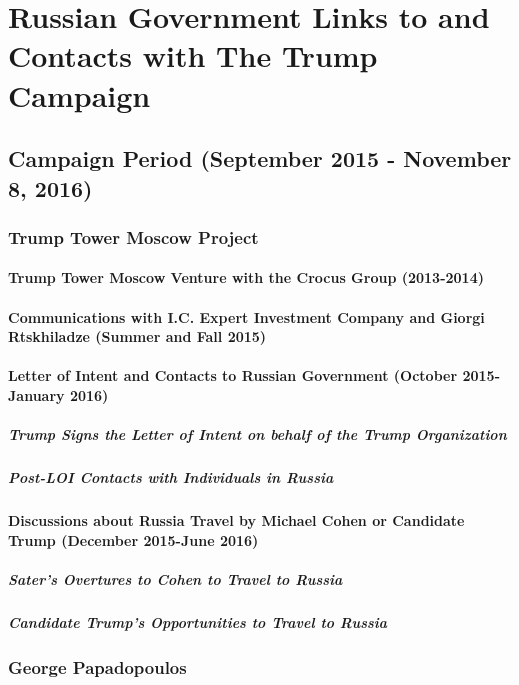 \section{Russian Government Links to and Contacts with The Trump Campaign}

\subsection{Campaign Period (September 2015 - November 8, 2016)}

\subsubsection{Trump Tower Moscow Project}

\paragraph{Trump Tower Moscow Venture with the Crocus Group (2013-2014)}

\paragraph{Communications with I.C. Expert Investment Company and Giorgi Rtskhiladze (Summer and Fall 2015)}

\paragraph{Letter of Intent and Contacts to Russian Government (October 2015-January 2016)}

\subparagraph{Trump Signs the Letter of Intent on behalf of the Trump Organization}

\subparagraph{Post-LOI Contacts with Individuals in Russia}

\paragraph{Discussions about Russia Travel by Michael Cohen or Candidate Trump (December 2015-June 2016)}

\subparagraph{Sater's Overtures to Cohen to Travel to Russia}

\subparagraph{Candidate Trump's Opportunities to Travel to Russia}

\subsubsection{George Papadopoulos}

